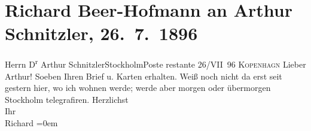

         \renewcommand{\erwaehnteOrte}{Orte: Kopenhagen, Stockholm}
         \renewcommand{\erwaehnteWerke}{}
               \section[Richard Beer-Hofmann an Arthur Schnitzler, 26. 7. 1896]{ Richard Beer-Hofmann an Arthur Schnitzler, 26. 7. 1896}\nopagebreak{}\rehead{ }\begin{ledgroupsized}[t]{13cm}\normalsize\beginnumbering \toendnotes[C]{\smallbreak\pagebreak[2]} 
\pstart{}{\pb}Herrn D\textsuperscript{r} Arthur Schnitzler\pend{}\pstart{}Stockholm\pend{}\pstart{}Poste restante\pend{}{\bigskip}\pstart
           \raggedleft{}{\pb}26/VII 96{ }\textsc{Kopenhagn}\pend
           \pstart
           Lieber Arthur! Soeben Ihre\introOben{}n\introOben{} Brief u.
               Karten erhalten. Weiß noch nicht da erst seit gestern hier, wo ich wohnen werde;
               werde aber morgen oder übermorgen Stockholm
               telegrafiren.\pend
           \pstart
           Herzlichst{\\[\baselineskip]}Ihr{\\[\baselineskip]}\spacefill\mbox{Richard}\pend
           \leftskip=0em{}
         
         \endnumbering{}\end{ledgroupsized}  \newcommand{\dateiname}{L00568}\newcommand{\titel}{Richard Beer-Hofmann an Arthur Schnitzler, 26. 7. 1896}\newcommand{\editorInnen}{Martin Anton Müller und Gerd-Hermann Susen}
      